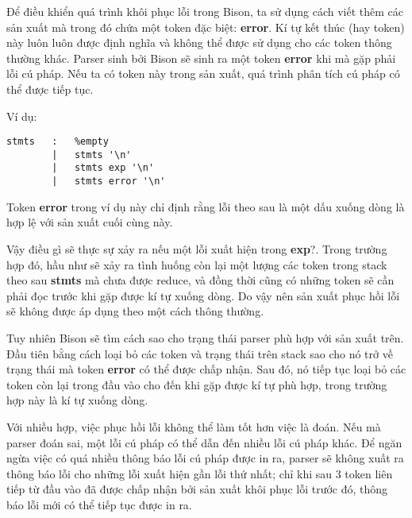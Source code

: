 \documentclass[../report.tex]{subfiles}
\begin{document}
Để điều khiển quá trình khôi phục lỗi trong Bison, ta sử dụng 
cách viết thêm các sản xuất mà trong đó chứa một token 
đặc biệt: \textbf{error}. Kí tự kết thúc (hay token) này luôn luôn
được định nghĩa và không thể được sử dụng cho các token thông thường 
khác. Parser sinh bởi Bison sẽ sinh ra một token \textbf{error}
khi mà gặp phải lỗi cú pháp. Nếu ta có token này trong sản xuất, 
quá trình phân tích cú pháp có thể được tiếp tục. 

Ví dụ: 
\begin{lstlisting}
stmts   :   %empty
        |   stmts '\n'
        |   stmts exp '\n'
        |   stmts error '\n'
\end{lstlisting}
Token \textbf{error} trong ví dụ này chỉ định rằng lỗi theo sau 
là một dấu xuống dòng là hợp lệ với sản xuất cuối cùng này. 

Vậy điều gì sẽ thực sự xảy ra nếu một lỗi xuất hiện trong 
\textbf{exp}?. Trong trường hợp đó, hầu như sẽ xảy ra tình huống
còn lại một lượng các token trong stack theo sau \textbf{stmts} 
mà chưa được reduce, và đồng thời cũng có những token 
sẽ cần phải đọc trước khi gặp được kí tự xuống dòng. Do vậy nên 
sản xuất phục hồi lỗi sẽ không được áp dụng theo một cách thông 
thường. 

Tuy nhiên Bison sẽ tìm cách sao cho trạng thái parser  phù hợp 
với sản xuất trên. Đầu tiên bằng cách loại bỏ các token và trạng 
thái trên stack sao cho nó trở về trạng thái mà token 
\textbf{error} có thể được chấp nhận. Sau đó, nó tiếp tục loại 
bỏ các token còn lại trong đầu vào cho đến khi gặp được kí tự 
phù hợp, trong trường hợp này là kí tự xuống dòng.

Với nhiều hợp, việc phục hồi lỗi không thể làm tốt hơn việc 
là đoán. Nếu mà parser đoán sai, một lỗi cú pháp có thể 
dẫn đến nhiều lỗi cú pháp khác. Để ngăn ngừa 
việc có quá nhiều thông báo lỗi cú pháp được in ra, parser 
sẽ không xuất ra thông báo lỗi cho những lỗi 
xuất hiện gần lỗi thứ nhất; chỉ khi sau 3 token liên tiếp 
từ đầu vào 
đã được chấp nhận bởi sản xuất khôi phục lỗi trước đó, 
thông báo lỗi mới có thể tiếp tục được in ra. 
\end{document}
